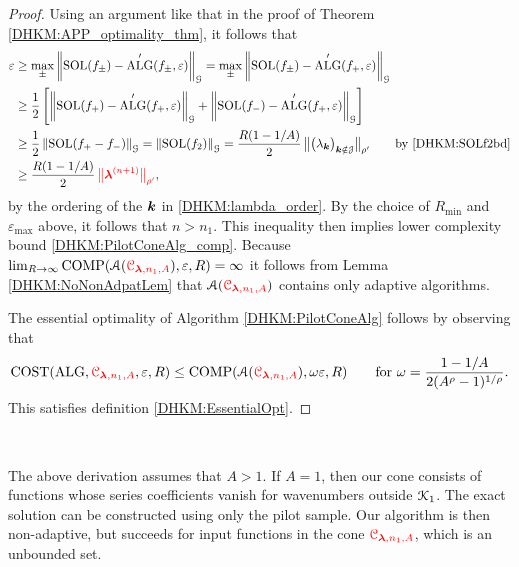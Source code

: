\documentclass[USenglish]{article}
\theoremstyle{dgthm}
\theoremstyle{dgthm}
\theoremstyle{dgthm}
\theoremstyle{dgthm}
\theoremstyle{dgdef}
\theoremstyle{definition}
\DeclareMathOperator{\SOL}{SOL}
\DeclareMathOperator{\ALG}{ALG}
\DeclareMathOperator{\COST}{COST}
\DeclareMathOperator{\COMP}{COMP}
\newcommand{\norm}[2][{}]{\ensuremath{\left \lVert #2 \right \rVert}_{#1}}
\newcommand{\bignorm}[2][{}]{\ensuremath{\bigl \lVert #2 \bigr \rVert}_{#1}}
\newcommand{\DHKMchange}[1]{{\color{red}{#1}}}
\begin{document}
\begin{proof}
Using an argument like that in the proof of  Theorem \ref{DHKM:APP_optimality_thm}, it follows that 
\begin{align*}
\varepsilon & \ge \max_{\pm} \norm[\calG]{\SOL(f_{\pm}) - \ALG'(f_{\pm},\varepsilon)} 
=  \max_{\pm} \norm[\calG]{\SOL(f_{\pm}) - \ALG'(f_{+},\varepsilon)} \\
& \ge \frac 12 \left [ \norm[\calG]{\SOL(f_{+}) - \ALG'(f_{+},\varepsilon)} 
+ \norm[\calG]{\SOL(f_{-}) - \ALG'(f_{+},\varepsilon)}  \right] \\
& \ge \frac 12 \norm[\calG]{\SOL(f_+ - f_-)} = \norm[\calG]{\SOL(f_2)} 
=\frac{R(1 - 1/A)}{2} \, \bignorm[\rho']{\bigl(  \lambda_{\bsk}  \bigr)_{\bsk \notin \calJ}} \qquad \text{by \eqref{DHKM:SOLf2bd}} \\
& \ge \frac{R(1 - 1/A)}{2} \, \DHKMchange{\bignorm[\rho']{\bslambda^{(n+1)}}} ,
\end{align*}
by the ordering of the ${\boldsymbol{k}}$ in \eqref{DHKM:lambda_order}.  By the choice of $R_{\min}$ and $\varepsilon_{\max}$ above, it follows that $n > n_1$.  This inequality then implies lower complexity bound \eqref{DHKM:PilotConeAlg_comp}. Because $\lim_{R \to \infty} \COMP(\calA(\DHKMchange{\calC_{\boldsymbol{\lambda},n_1,A}}), \varepsilon,R) = \infty$  it follows from Lemma \ref{DHKM:NoNonAdpatLem} that $\calA(\DHKMchange{\calC_{\boldsymbol{\lambda},n_1,A}})$ contains only adaptive algorithms.

The essential optimality of Algorithm \ref{DHKM:PilotConeAlg} follows by observing that 
\[
\COST(\ALG,\DHKMchange{\calC_{\boldsymbol{\lambda},n_1,A}},\varepsilon,R) \le \COMP(\calA(\DHKMchange{\calC_{\boldsymbol{\lambda},n_1,A}}),\omega \varepsilon,R) \qquad \text{for } \omega = \frac{1-1/A}{2(A^\rho -1)^{1/\rho}}.
\]
This satisfies definition \eqref{DHKM:EssentialOpt}.  
\end{proof} \

The above derivation assumes that $A > 1$.  If $A =1$, then our cone consists of functions whose series coefficients vanish for wavenumbers outside ${\mathcal{K}}_1$.  The exact solution can be constructed using only the pilot sample.  Our algorithm is then non-adaptive, but succeeds for input functions in the cone $\DHKMchange{\calC_{\boldsymbol{\lambda},n_1,A}}$, which is an unbounded set.
\end{document}
